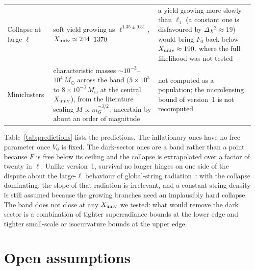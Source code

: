 \documentclass[11pt,a4paper]{article}
\newcommand{\Xu}{X_{\rm univ}}
\begin{document}
\begin{table}[t]
\begin{tabular}{L{3.0cm}L{5.4cm}L{5.6cm}}
Collapse at large $\ell$ & soft yield growing as $\ell^{1.35\pm0.31}$, $\Xu\simeq244$--$1370$ & a yield growing more slowly than $\ell_1$ (a constant one is disfavoured by $\Delta\chi^2\approx19$) would bring $F_0$ back below $\Xu\approx190$, where the full likelihood was not tested\\
Miniclusters & characteristic masses $\sim10^{-3}$--$10^{4}\,M_\odot$ across the band ($5\times10^3$ to $8\times10^{-3}\,M_\odot$ at the central $\Xu$), from the literature scaling $M\propto m_G^{-3/2}$; uncertain by about an order of magnitude & not computed as a population; the microlensing bound of version~1 is not recomputed\\
\bottomrule
\end{tabular}
\end{table}

Table~\ref{tab:predictions} lists the predictions.
The inflationary ones have no free parameter once $V_0$ is fixed.
The dark-sector ones are a band rather than a point because $F$ is free below its ceiling and the collapse is extrapolated over a factor of twenty in $\ell$.
Unlike version~1, survival no longer hinges on one side of the dispute about the large-$\ell$ behaviour of global-string radiation~\cite{GHV2021,Buschmann2022,KimParkSon2024,Saikawa2024,Benabou2025,Correia2025spectrum}: with the collapse dominating, the slope of that radiation is irrelevant, and a constant string density is still assumed because the growing branches need an implausibly hard collapse.
The band does not close at any $\Xu$ we tested: what would remove the dark sector is a combination of tighter superradiance bounds at the lower edge and tighter small-scale or isocurvature bounds at the upper edge.

\section{Open assumptions}
\label{sec:open}
\end{document}
